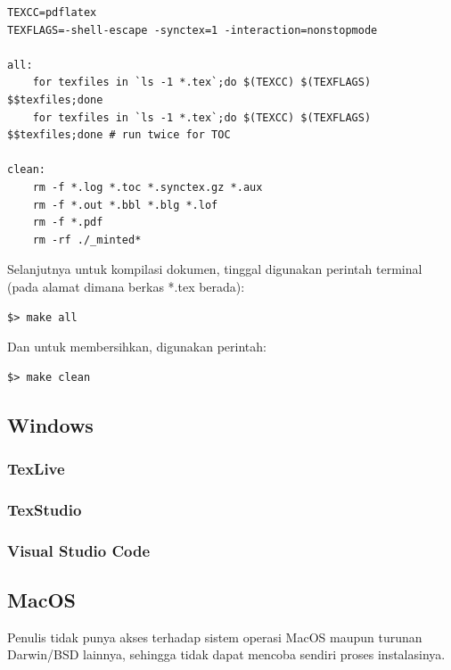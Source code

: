 \documentclass{book} %
\begin{document}
	\begin{verbatim}
TEXCC=pdflatex
TEXFLAGS=-shell-escape -synctex=1 -interaction=nonstopmode

all:
	for texfiles in `ls -1 *.tex`;do $(TEXCC) $(TEXFLAGS) $$texfiles;done
	for texfiles in `ls -1 *.tex`;do $(TEXCC) $(TEXFLAGS) $$texfiles;done # run twice for TOC

clean:
	rm -f *.log *.toc *.synctex.gz *.aux
	rm -f *.out *.bbl *.blg *.lof
	rm -f *.pdf
	rm -rf ./_minted*
	\end{verbatim}

	Selanjutnya untuk kompilasi dokumen, tinggal digunakan perintah terminal (pada alamat dimana berkas *.tex berada):

	\begin{verbatim}
$> make all
	\end{verbatim}

	Dan untuk membersihkan, digunakan perintah:

	\begin{verbatim}
$> make clean
	\end{verbatim}

	\subsection{Windows}

	\subsubsection{TexLive}
	\subsubsection{TexStudio}
	\subsubsection{Visual Studio Code}

	\subsection{MacOS}

	Penulis tidak punya akses terhadap sistem operasi MacOS maupun turunan Darwin/BSD lainnya,
	sehingga tidak dapat mencoba sendiri proses instalasinya.
\end{document}
